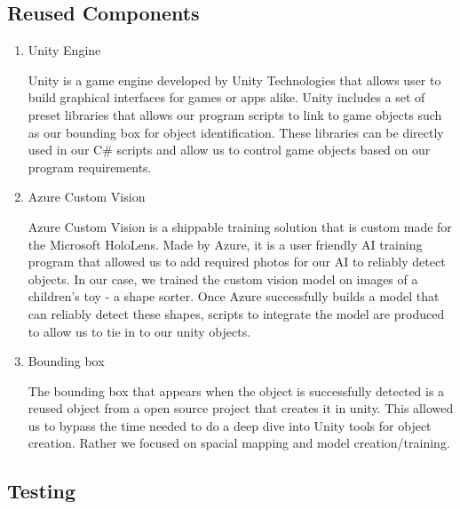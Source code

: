 \documentclass[12pt]{article}
\begin{document}
\subsection{Reused Components}
\begin{enumerate}
    \item Unity Engine
    \begin{description}
        \hspace{1cm}
        Unity is a game engine developed by Unity Technologies that allows user to build graphical interfaces for games or apps alike. Unity includes a set of preset libraries that allows our program scripts to link to game objects such as our bounding box for object identification. These libraries can be directly used in our C\# scripts and allow us to control game objects based on our program requirements.

    \end{description}
    
    \item Azure Custom Vision 
    \begin{description}
        \hspace{1cm} 
       Azure Custom Vision is a shippable training solution that is custom made for the Microsoft HoloLens. Made by Azure, it is a user friendly AI training program that allowed us to add required photos for our AI to reliably detect objects. In our case, we trained the custom vision model on images of a children's toy - a shape sorter. Once Azure successfully builds a model that can reliably detect these shapes, scripts to integrate the model are produced to allow us to tie in to our unity objects. 
    \end{description}
    
    \item Bounding box
    \begin{description}
        \hspace{1cm}
       The bounding box that appears when the object is successfully detected is a reused object from a open source project that creates it in unity. This allowed us to bypass the time needed to do a deep dive into Unity tools for object creation. Rather we focused on spacial mapping and model  creation/training. 
    \end{description}
\end{enumerate}

\newpage
\subsection{Testing}
\end{document}
